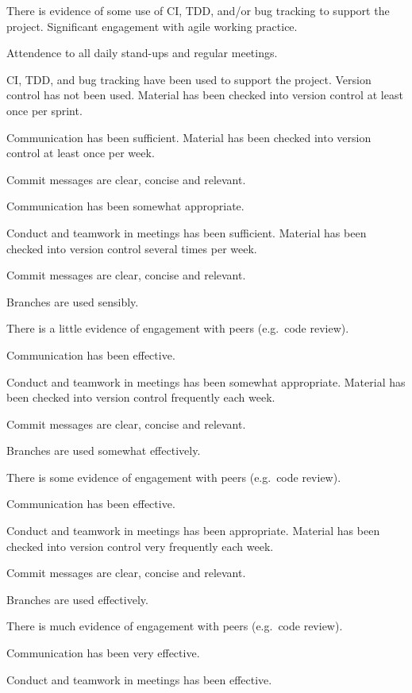 \documentclass{../../fal_assignment}
\begin{document}
\begin{markingrubric}
            \par There is evidence of some use of CI, TDD, and/or bug tracking to support the project.
        \grade Significant engagement with agile working practice.
            \par Attendence to all daily stand-ups and regular meetings.
            \par CI, TDD, and bug tracking have been used to support the project.
%
        \grade\fail Version control has not been used.
        \grade Material has been checked into version control at least once per sprint.
            \par Communication has been sufficient.
        \grade Material has been checked into version control at least once per week.
            \par Commit messages are clear, concise and relevant.
            \par Communication has been somewhat appropriate.
            \par Conduct and teamwork in meetings has been sufficient.
        \grade Material has been checked into version control several times per week.
            \par Commit messages are clear, concise and relevant.
            \par Branches are used sensibly.
            \par There is a little evidence of engagement with peers (e.g.\ code review).
            \par Communication has been effective.
            \par Conduct and teamwork in meetings has been somewhat appropriate.
        \grade Material has been checked into version control frequently each week.
            \par Commit messages are clear, concise and relevant.
            \par Branches are used somewhat effectively.
            \par There is some evidence of engagement with peers (e.g.\ code review).
            \par Communication has been effective.
            \par Conduct and teamwork in meetings has been appropriate.
        \grade Material has been checked into version control very frequently each week.
            \par Commit messages are clear, concise and relevant.
            \par Branches are used effectively.
            \par There is much evidence of engagement with peers (e.g.\ code review).
            \par Communication has been very effective.
            \par Conduct and teamwork in meetings has been effective.
\end{markingrubric}
\end{document}
